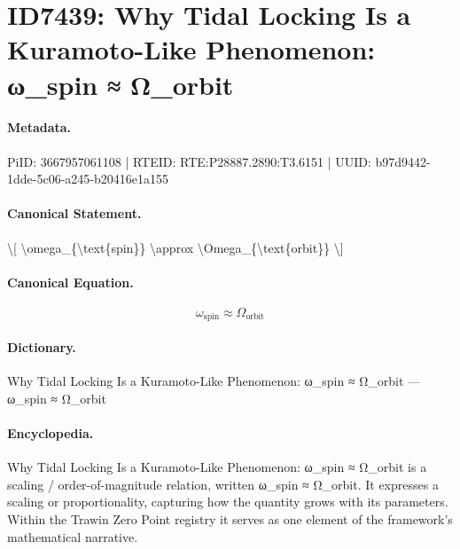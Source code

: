 \section*{ID7439: Why Tidal Locking Is a Kuramoto-Like Phenomenon: ω\_spin ≈ Ω\_orbit}
\paragraph{Metadata.}
PiID: 3667957061108 | RTEID: RTE:P28887.2890:T3.6151 | UUID: b97d9442-1dde-5c06-a245-b20416e1a155

\paragraph{Canonical Statement.}
\textbackslash{}[ \textbackslash{}omega\_\{\textbackslash{}text\{spin\}\} \textbackslash{}approx \textbackslash{}Omega\_\{\textbackslash{}text\{orbit\}\} \textbackslash{}]

\paragraph{Canonical Equation.}
\[
\omega_{\text{spin}} \approx \Omega_{\text{orbit}}
\]

\paragraph{Dictionary.}
Why Tidal Locking Is a Kuramoto-Like Phenomenon: ω\_spin ≈ Ω\_orbit — ω\_spin ≈ Ω\_orbit

\paragraph{Encyclopedia.}
Why Tidal Locking Is a Kuramoto-Like Phenomenon: ω\_spin ≈ Ω\_orbit is a scaling / order-of-magnitude relation, written ω\_spin ≈ Ω\_orbit. It expresses a scaling or proportionality, capturing how the quantity grows with its parameters. Within the Trawin Zero Point registry it serves as one element of the framework's mathematical narrative.
